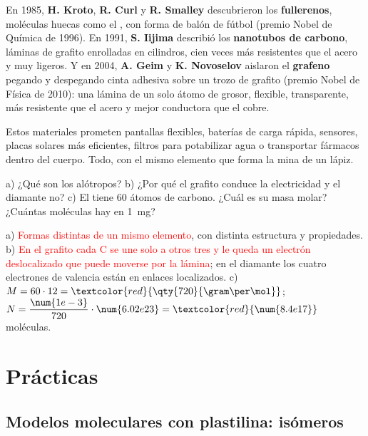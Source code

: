 En 1985, \textbf{H. Kroto}, \textbf{R. Curl} y \textbf{R. Smalley} descubrieron los \textbf{fullerenos}, moléculas huecas como el
, con forma de balón de fútbol (premio Nobel de Química de 1996). En 1991, \textbf{S. Iijima} describió los
\textbf{nanotubos de carbono}, láminas de grafito enrolladas en cilindros, cien veces más resistentes que el acero y muy ligeros.
Y en 2004, \textbf{A. Geim} y \textbf{K. Novoselov} aislaron el \textbf{grafeno} pegando y despegando cinta adhesiva sobre un trozo
de grafito (premio Nobel de Física de 2010): una lámina de un solo átomo de grosor, flexible, transparente, más resistente que el
acero y mejor conductora que el cobre.

Estos materiales prometen pantallas flexibles, baterías de carga rápida, sensores, placas solares más eficientes, filtros para
potabilizar agua o transportar fármacos dentro del cuerpo. Todo, con el mismo elemento que forma la mina de un lápiz.

\begin{exercise}
    a) ¿Qué son los alótropos? b) ¿Por qué el grafito conduce la electricidad y el diamante no? c) El  tiene 60 átomos de
    carbono. ¿Cuál es su masa molar? ¿Cuántas moléculas hay en \qty{1}{\milli\gram}?
    \begin{solu}
        a) \textcolor{red}{Formas distintas de un mismo elemento}, con distinta estructura y propiedades. b) \textcolor{red}{En el
        grafito cada C se une solo a otros tres y le queda un electrón deslocalizado que puede moverse por la lámina}; en el diamante
        los cuatro electrones de valencia están en enlaces localizados. c) \(M = 60 \cdot 12 = \textcolor{red}{\qty{720}{\gram\per\mol}}\);
        \(N = \dfrac{\num{1e-3}}{720} \cdot \num{6.02e23} = \textcolor{red}{\num{8.4e17}}\) moléculas.
    \end{solu}
\end{exercise}

\section{Prácticas}\label{sec:ud7-practicas}

\subsection{Modelos moleculares con plastilina: isómeros}

